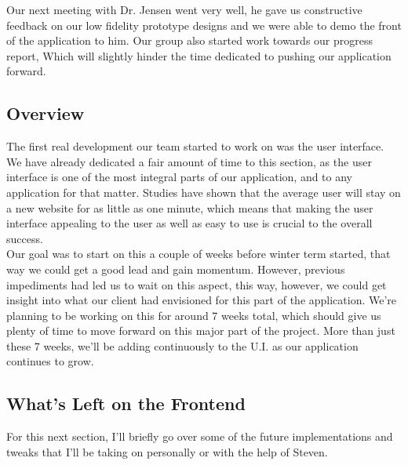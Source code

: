 \documentclass[onecolumn, draftclsnofoot,10pt, compsoc]{IEEEtran}
\begin{document}
\noindent Our next meeting with Dr. Jensen went very well, he gave us constructive feedback on 
our low fidelity prototype designs and we were able to demo the front of the application to him.
Our group also started work towards our progress report, Which will slightly hinder the time
dedicated to pushing our application forward.\\

\subsection{Overview}
\noindent The first real development our team started to work on was the user interface. We have already
dedicated a fair amount of time to this section, as the user interface is one of the most
integral parts of our application, and to any application for that matter. Studies have shown
that the average user will stay on a new website for as little as one minute, which means
that making the user interface appealing to the user as well as easy to use is crucial to the
overall success.\\

\noindent Our goal was to start on this a couple of weeks before winter term started, that way we could
get a good lead and gain momentum. However, previous impediments had led us to wait on this
aspect, this way, however, we could get insight into what our client had envisioned for this
part of the application. We're planning to be working on this for around 7 weeks total, which
should give us plenty of time to move forward on this major part of the project. More than
just these 7 weeks, we'll be adding continuously to the U.I. as our application continues to
grow.

\subsection{What's Left on the Frontend}

\noindent  For this next section, I'll briefly go over some of the future implementations 
and tweaks that I'll be taking on personally or with the help of Steven.
\end{document}
